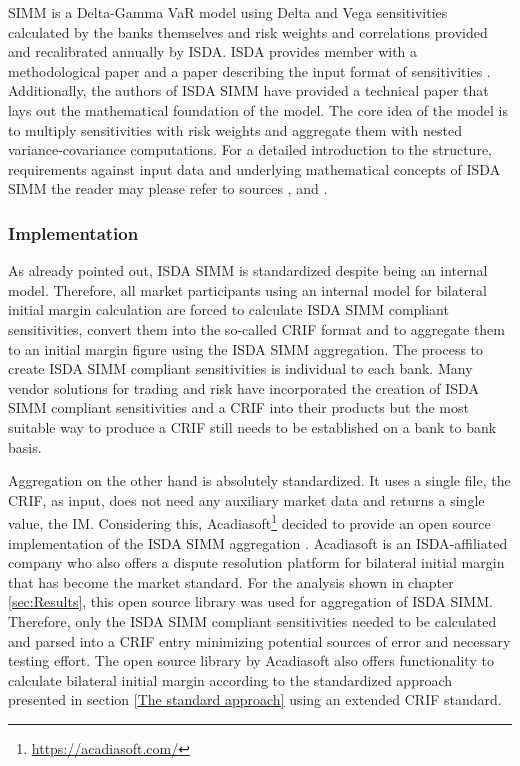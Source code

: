 \documentclass[../Thesis_AHoecherl.tex]{subfiles}
\begin{document}
    SIMM is a Delta-Gamma \gls{VaR} model using Delta and Vega sensitivities calculated by the banks themselves and risk weights and correlations provided and recalibrated annually by \gls{ISDA}. \gls{ISDA} provides member with a methodological paper \cite{SIMM} and a paper describing the input format of sensitivities \cite{RiskDataStandard}.
    Additionally, the authors of \gls{ISDA SIMM} have provided a technical paper \cite{SIMM_technical_paper} that lays out the mathematical foundation of the model. 
    The core idea of the model is to multiply sensitivities with risk weights and aggregate them with nested variance-covariance computations. For a detailed introduction to the structure, requirements against input data and underlying mathematical concepts of \gls{ISDA SIMM} the reader may please refer to sources \cite{SIMM}, \cite{RiskDataStandard} and \cite{SIMM_technical_paper}.

    \subsubsection{Implementation}\label{sec:ISDA SIMM implementation}
    As already pointed out, \gls{ISDA SIMM} is standardized despite being an internal model. Therefore, all market participants using an internal model for bilateral initial margin calculation are forced to calculate \gls{ISDA SIMM} compliant sensitivities, convert them into the so-called \gls{CRIF} format and to aggregate them to an initial margin figure using the \gls{ISDA SIMM} aggregation.
    The process to create \gls{ISDA SIMM} compliant sensitivities is individual to each bank. Many vendor solutions for trading and risk have incorporated the creation of \gls{ISDA SIMM} compliant sensitivities and a \gls{CRIF} into their products but the most suitable way to produce a \gls{CRIF} still needs to be established on a bank to bank basis.
    
    Aggregation on the other hand is absolutely standardized. It uses a single file, the \gls{CRIF}, as input, does not need any auxiliary market data and returns a single value, the IM. 
    Considering this, Acadiasoft\footnote{\url{https://acadiasoft.com/}} decided to provide an open source implementation of the \gls{ISDA SIMM} aggregation \cite{simm-lib}. Acadiasoft is an \gls{ISDA}-affiliated company who also offers a dispute resolution platform for bilateral initial margin that has become the market standard.
    For the analysis shown in chapter \ref{sec:Results}, this open source library was used for aggregation of \gls{ISDA SIMM}. 
    Therefore, only the \gls{ISDA SIMM} compliant sensitivities needed to be calculated and parsed into a \gls{CRIF} entry minimizing potential sources of error and necessary testing effort. The open source library by Acadiasoft also offers functionality to calculate bilateral initial margin according to the standardized approach presented in section \ref{The standard approach} using an extended \gls{CRIF} standard.
\end{document}
